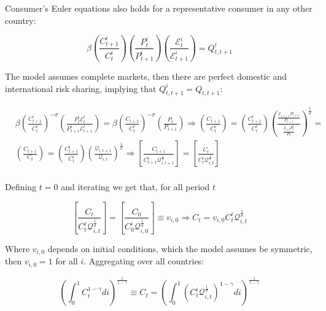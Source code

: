 \documentclass{article}
\newcommand{\E}{\mathcal{E}}
\begin{document}
Consumer's Euler equations also holds for a representative consumer in any other country:

$$\beta \left( \frac{C^i_{t+1}}{C_t^i} \right) \left( \frac{P_t^i}{P^i_{t+1}} \right) \left( \frac{\E^i_t}{\E^i_{t+1}} \right) = Q^i_{t, t+1}$$

The model assumes complete markets, then there are perfect domestic and international risk sharing, implying that $Q^i_{t, t+1} = Q_{t,t+1}$:

\begin{equation}
\begin{array}{cc}
     &\beta \left( \frac{C^i_{t+1}}{C_t^i} \right)^{-\sigma} \left( \frac{P_t^i \E^i_t}{P^i_{t+1} \E^i_{t+1}} \right) = \beta \left( \frac{C_{t+1}}{C_t^i} \right)^{-\sigma} \left( \frac{P_t}{P_{t+1}} \right) \Rightarrow \left( \frac{C_{t+1}}{C_t^i} \right) = \left( \frac{C^i_{t+1}}{C_t^i} \right) \left(\frac{\frac{\E_{i,t+1} P^i_{t+1}}{P_{t+1}}}{\frac{\E_{i,t} P^i_{t}}{P_{t}}} \right)^{\frac{1}{\sigma}} = \\
     &\left( \frac{C_{t+1}}{C_t} \right) = \left( \frac{C^i_{t+1}}{C_t^i} \right) \left(\frac{\mathcal{Q}_{i,t+1}}{\mathcal{Q}_{i,t}} \right)^{\frac{1}{\sigma}} \Rightarrow \left[\frac{C_{t+1}}{C^i_{t+1} \mathcal Q_{i,t+1}^{\frac{1}{\sigma}}}\right] =  \left[\frac{C_t}{C^i_t \mathcal Q_{i,t}^{\frac{1}{\sigma}}} \right] \\
\end{array}
\end{equation}

Defining $t = 0$ and iterating we get that, for all period $t$

\begin{equation}
    \left[\frac{C_{t}}{C^i_{t} \mathcal Q_{i,t}^{\frac{1}{\sigma}}}\right] =  \left[\frac{C_0}{C^i_0 \mathcal Q_{i,0}^{\frac{1}{\sigma}}} \right] \equiv v_{i, 0} \Rightarrow C_t = v_{i,0} C^i_t \mathcal Q_{i,t}^{\frac{1}{\sigma}}
\end{equation}

Where $v_{i,0}$ depends on initial conditions, which the model assumes be symmetric, then $v_{i,0} = 1$ for all $i$. Aggregating over all countries:

\begin{equation}
    \label{consumption}
    \left(\int^1_0 C_t^{1-\gamma} di \right)^{\frac{1}{1-\gamma}} \equiv C_t = \left(\int^1_0  \left(C_t^i \mathcal Q_{i,t}^{\frac{1}{\sigma}}\right)^{1-\gamma} di \right)^{\frac{1}{1-\gamma}}
\end{equation}
\end{document}
